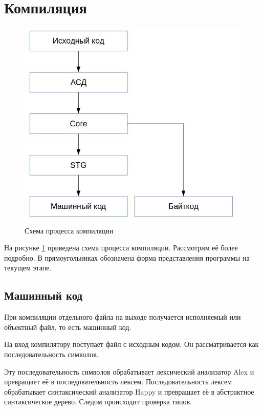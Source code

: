 \documentclass[fontsize=14pt, paper=a4, pagesize, DIV=calc]{scrartcl}
\begin{document}
\section{Компиляция}

\begin{figure}[H]
\centering
\caption{Схема процесса компиляции}
\label{fig:compilation}
\includegraphics[scale=0.8]{compilation.jpg}
\end{figure}

На рисунке \ref{fig:compilation} приведена схема процесса компиляции.
Рассмотрим её более подробно. В прямоугольниках обозначена форма представления
программы на текущем этапе.

\subsection{Машинный код}

При компиляции отдельного файла на выходе получается исполняемый или объектный
файл, то есть машинный код. 

На вход компилятору поступает файл с исходным кодом. Он рассматривается как 
последовательность символов.

Эту последовательность символов обрабатывает лексический анализатор Alex и
превращает её в последовательность лексем. Последовательность лексем
обрабатывает синтаксический анализатор Happy и превращает её в абстрактное
синтаксическое дерево. Следом происходит проверка типов.
\end{document}
